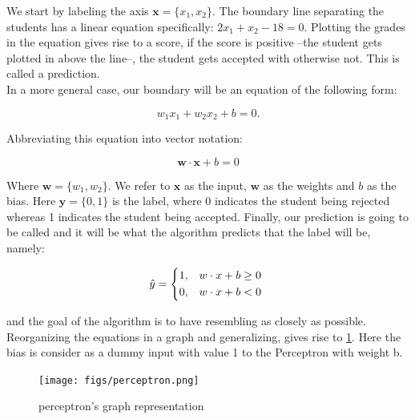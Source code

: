 We start by labeling the axis $\textbf{x} = \{x_{1}, x_{2}\}$.
The boundary line separating the students has a linear equation
specifically: $2x_{1} + x_{2} - 18 = 0$.
Plotting the grades in the equation gives rise to a score, if the score is positive --the student
gets plotted in above the line--, the student gets accepted with otherwise not. This is called a prediction.\\

In a more general case, our boundary will be an equation of the following form:

$$w_{1}x_{1} + w_{2}x_{2} + b = 0.$$

Abbreviating this equation into vector notation:

\begin{equation}
  \label{linear}
  \textbf{w}\cdot\textbf{x} + b = 0
\end{equation}

Where $\textbf{w} = \{w_{1}, w_{2}\}$. We refer to $\textbf{x}$ as the input, $\textbf{w}$ as the weights and $b$ as the bias. Here $\textbf{y} = \{0, 1\}$ is the label, where 0 indicates the student being rejected whereas 1 indicates the student being accepted. Finally, our prediction is going to be called \mbox{} and it will be what the algorithm predicts that the label will be, namely:

\begin{equation}
  \label{y_hat}
  \hat{y} =
  \begin{dcases*}
    \text{1,}  &$w\cdot x + b \geq 0$ \\
    \text{0,}  &$w\cdot x + b < 0$
  \end{dcases*}
\end{equation}

and the goal of the algorithm is to have \mbox{} resembling \mbox{} as closely as possible. Reorganizing the equations in a graph and generalizing, gives rise to \cref{fig:neuron}. Here the bias is consider as a dummy input with value 1 to the Perceptron with weight b.

\begin{figure}[H]
  \centering
  \texttt{[image: figs/perceptron.png]}
  \caption{perceptron's graph representation}\label{fig:neuron}
\end{figure}

